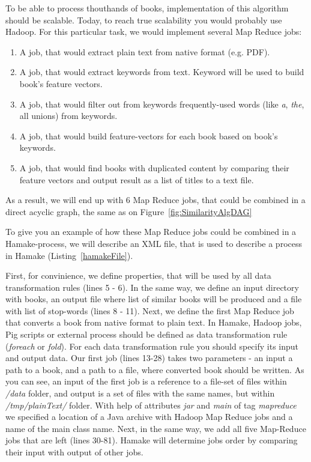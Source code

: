 \documentclass{article}
\begin{document}
To be able to process thouthands of books, implementation of this algorithm should be scalable.
Today, to reach true scalability you would probably use Hadoop. For this particular task,
 we would implement several Map Reduce jobs:

\begin{enumerate}
  \item A job, that would extract plain text from native format (e.g. PDF).
  \item A job, that would extract keywords from text. Keyword will be used to build book's feature vectors.
  \item A job, that would filter out from keywords frequently-used words (like \textit{a}, \textit{the}, all unions) from keywords.
  \item A job, that would build feature-vectors for each book based on book's keywords.
  \item A job, that would find books with duplicated content by comparing their feature vectors and output result as a list of titles to a text file.
\end{enumerate}

As a result, we will end up with 6 Map Reduce jobs, that could be combined in a direct acyclic graph, the same as on Figure~\ref{fig:SimilarityAlgDAG}

To give you an example of how these Map Reduce jobs could be combined in a Hamake-process, we will describe an XML file, that is used to describe a process in Hamake (Listing~\ref{hamakeFile}).

First, for convinience, we define properties, that will be used by all data transformation rules (lines 5 - 6). In the same way, we define
an input directory with books, an output file where list of similar books will be produced and a file with list of stop-words (lines 8 - 11).
Next, we define the first Map Reduce job that converts a book from native format to plain text. In Hamake, Hadoop jobs, Pig scripts or external process should be
defined as data transformation rule (\textit{foreach} or \textit{fold}). For each data transformation rule you should 
specify its input and output data. Our first job (lines 13-28) takes two parameters - an input a path to a book, and a path to a file, where converted book should be written. 
As you can see, an input of the first job is a reference to a file-set of files within \textit{/data} folder, and output is a
set of files with the same names, but within \textit{/tmp/plainText/} folder. With help of attributes \textit{jar} and \textit{main} of tag 
\textit{mapreduce} we specified a location of a Java archive with Hadoop Map Reduce jobs and a name of the main class name. Next, in the same way, we add all five
 Map-Reduce jobs that are left (lines 30-81). Hamake will determine jobs order by comparing their input with output of other jobs.
\end{document}
